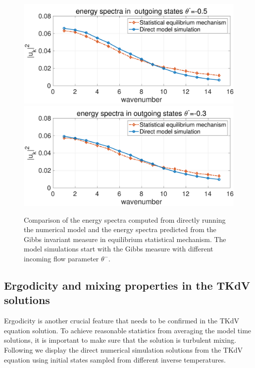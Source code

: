 \documentclass[9pt,twoside,lineno]{pnas-new}
\theoremstyle{plain}
\theoremstyle{plain}
\begin{document}
\begin{figure}
\begin{centering}
\includegraphics[scale=0.32]{./specEqui_th05}\includegraphics[scale=0.32]{./specEqui_th03}
\par\end{centering}
\caption{Comparison of the energy spectra computed from directly running the numerical 
model and the energy spectra predicted from the
Gibbs invariant measure in equilibrium statistical mechanism. The
model simulations start with the Gibbs measure with different
incoming flow parameter $\theta^{-}$.\label{fig:Comparison-spec }}
\end{figure}

\subsection{Ergodicity and mixing properties in the TKdV solutions}

Ergodicity is another crucial feature that needs to be confirmed in
the TKdV equation solution. To achieve reasonable statistics
from averaging the model time solutions, it is important to make sure
that the solution is turbulent mixing. Following we display the
direct numerical simulation solutions from the TKdV equation using
initial states sampled from different inverse temperatures.
\end{document}
